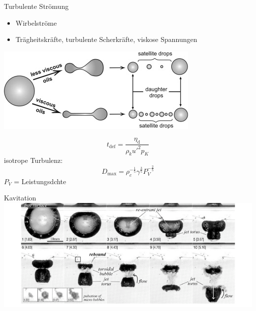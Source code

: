 \documentclass{beamer} %
\newcommand{\tx}[1]{\textrm{#1}}
\begin{document}
\begin{frame}{Turbulente Strömung}
	\begin{minipage}{0.4\linewidth}
		\begin{itemize}
			\item Wirbelströme
			\item Trägheitskräfte, turbulente Scherkräfte, viskose Spannungen
		\end{itemize}
	\end{minipage}%
	\begin{minipage}{0.6\linewidth}
		\includegraphics[width=\linewidth]{Markus/turbulentflowdrops}
	\end{minipage}
	\begin{equation*}
	t_{\tx{def}} = \frac{\eta_{\tx{d}}}{\rho_k u'^2 p_K}
	\end{equation*}
	isotrope Turbulenz:
	\begin{equation*}
	D_{\tx{max}} = \rho_c^{-\frac{1}{5}} \gamma^{\frac{3}{5}} P_V^{-\frac{2}{5}}
	\end{equation*}
	$ P_V $ = Leistungsdchte
\end{frame}

\begin{frame}{Kavitation}
	\includegraphics[width=\linewidth]{Markus/Cavitationbubble}
\end{frame}
\end{document}
